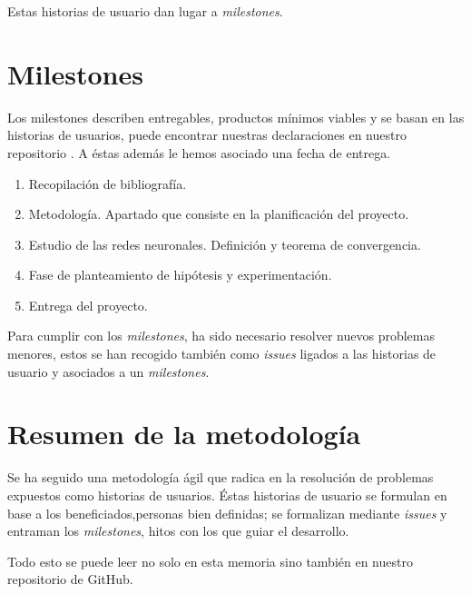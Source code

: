 
Estas historias de usuario dan lugar a \textit{milestones}. 

\section{Milestones}  

Los milestones describen entregables, productos mínimos viables y se basan en las historias de usuarios,
puede encontrar nuestras declaraciones en nuestro repositorio \cite{TFG-Estudio-de-las-redes-neuronales-milestones}. 
A éstas además le hemos asociado una fecha de entrega. 

\begin{enumerate}
    \item Recopilación de bibliografía. 
    \item Metodología. Apartado que consiste en la planificación del proyecto. 
    \item Estudio de las redes neuronales. Definición y teorema de convergencia. 
    \item Fase de planteamiento de hipótesis y experimentación. 
    \item Entrega del proyecto.
\end{enumerate}  

Para cumplir con los \textit{milestones},  ha sido necesario resolver nuevos  problemas menores, estos se han
recogido también como \textit{issues} ligados a las historias de usuario y asociados a un  \textit{milestones}.

\section{Resumen de la metodología}  

Se ha seguido una metodología ágil que radica en la resolución de problemas expuestos como historias de usuarios. 
Éstas historias de usuario se formulan en base a los beneficiados,personas bien definidas; se formalizan 
mediante \textit{issues} y entraman los \textit{milestones}, hitos con los que guiar el desarrollo.

Todo esto se puede leer no solo en esta memoria sino también en nuestro repositorio de GitHub. 
 




